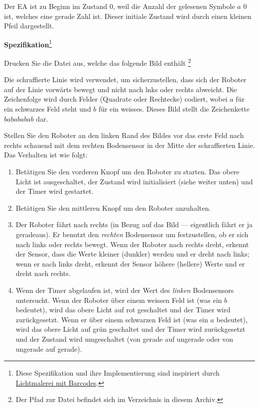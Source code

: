 Der EA ist zu Beginn im Zustand 0, weil die Anzahl der gelesenen Symbole $a$ 0 ist, welches eine gerade Zahl ist. Dieser initiale Zustand wird durch einen kleinen Pfeil dargestellt. 

\textbf{Spezifikation}\footnote{Diese Spezifikation und ihre Implementierung sind inspiriert durch \href{https://www.thymio.org/de:barcodelightpainting}{Lichtmalerei mit Barcodes}.}

Drucken Sie die Datei  aus, welche das folgende Bild enthält \footnote{Der Pfad zur Datei befindet sich im Verzeichnis  in diesem Archiv.}


Die schraffierte Linie wird verwendet, um sicherzustellen, dass sich der Roboter auf der Linie vorwärts bewegt und nicht nach lnks oder rechts abweicht. Die Zeichenfolge wird durch Felder (Quadrate oder Rechtecke) codiert, wobei $a$ für ein schwarzes Feld steht und $b$ für ein weisses. Dieses Bild stellt die Zeichenkette $babababab$ dar.

Stellen Sie den Roboter an den linken Rand des Bildes vor das erste Feld nach rechts schauend mit dem rechten Bodensensor in der Mitte der schraffierten Linie. 
Das Verhalten ist wie folgt:

\begin{enumerate}

\item Betätigen Sie den vorderen Knopf um den Roboter zu starten. Das obere Licht ist ausgeschaltet, der Zustand wird initialisiert (siehe weiter unten) und der Timer wird gestartet. 

\item Betätigen Sie den mittleren Knopf um den Roboter anzuhalten.

\item Der Roboter fährt nach rechts (in Bezug auf das Bild --- eigentlich fährt er ja geradeaus). Er benutzt den \emph{rechten} Bodensensor um festzustellen, ob er sich nach links oder rechts bewegt. Wenn der Roboter nach rechts dreht, erkennt der Sensor, dass die Werte kleiner (dunkler) werden und er dreht nach links; wenn er nach links dreht, erkennt der Sensor höhere (hellere) Werte und er dreht nach rechts. 

\item Wenn der Timer abgelaufen ist, wird der Wert des \emph{linken} Bodensensors untersucht. Wenn der Roboter über einem weissen Feld ist (was ein $b$ bedeutet), wird das obere Licht auf rot geschaltet und der Timer wird zurückgesetzt. Wenn er über einem schwarzen Feld ist (was ein $a$ bedeutet), wird das obere Licht auf grün geschaltet und der Timer wird zurückgesetzt und der Zustand wird umgeschaltet (von gerade auf ungerade oder von ungerade auf gerade). 

\end{enumerate}


